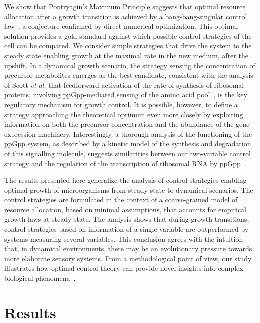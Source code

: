 We show that Pontryagin's Maximum Principle suggests that optimal resource allocation after a growth transition is achieved by a bang-bang-singular control law~\cite{stengel_optimal_1994}, a conjecture confirmed by direct numerical optimization.
This optimal solution provides a gold standard against which possible control strategies of the cell can be compared.
We consider simple strategies that drive the system to the steady state enabling growth at the maximal rate in the new medium, after the upshift.
In a dynamical growth scenario, the strategy sensing the concentration of precursor metabolites emerges as the best candidate, consistent with the analysis of Scott \textit{et al.} that feedforward activation of the rate of synthesis of ribosomal proteins, involving ppGpp-mediated sensing of the amino acid pool~\cite{dalebroux_ppgpp_2012,potrykus_pppgpp_2008,hauryliuk_recent_2015}, is the key regulatory mechanism for growth control.
It is possible, however, to define a strategy approaching the theoretical optimum even more closely by exploiting information on both the precursor concentration and the abundance of the gene expression machinery.
Interestingly, a thorough analysis of the functioning of the ppGpp system, as described by a kinetic model of the synthesis and degradation of this signalling molecule, suggests similarities between our two-variable control strategy and the regulation of the transcription of ribosomal RNA by ppGpp~\cite{bosdriesz_how_2015}.

The results presented here generalize the analysis of control strategies enabling optimal growth of microorganisms from steady-state to dynamical scenarios.
The control strategies are formulated in the context of a coarse-grained model of resource allocation, based on minimal assumptions, that accounts for empirical growth laws at steady state.
The analysis shows that during growth transitions, control strategies based on information of a single variable are outperformed by systems measuring several variables.
This conclusion agrees with the intuition that, in dynamical environments, there may be an evolutionary pressure towards more elaborate sensory systems.
From a methodological point of view, our study illustrates how optimal control theory can provide novel insights into complex biological phenomena~\cite{iglesias_control_2010}. 


\section{Results}

